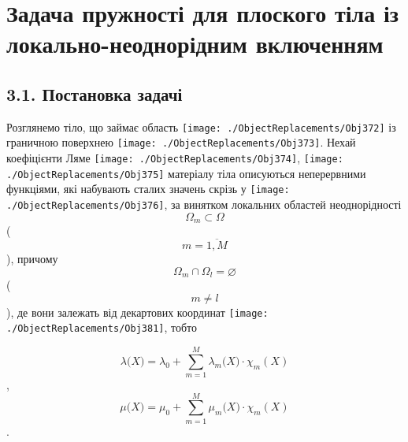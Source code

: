 \hypertarget{ux437ux430ux434ux430ux447ux430-ux43fux440ux443ux436ux43dux43eux441ux442ux456-ux434ux43bux44f-ux43fux43bux43eux441ux43aux43eux433ux43e-ux442ux456ux43bux430-ux456ux437-ux43bux43eux43aux430ux43bux44cux43dux43e-ux43dux435ux43eux434ux43dux43eux440ux456ux434ux43dux438ux43c-ux432ux43aux43bux44eux447ux435ux43dux43dux44fux43c}{%
\section[Задача пружності для плоского тіла із локально-неоднорідним
включенням]{\texorpdfstring{\protect\hypertarget{anchor-44}{}{}Задача
пружності для плоского тіла із локально-неоднорідним
включенням}{Задача пружності для плоского тіла із локально-неоднорідним включенням}}\label{ux437ux430ux434ux430ux447ux430-ux43fux440ux443ux436ux43dux43eux441ux442ux456-ux434ux43bux44f-ux43fux43bux43eux441ux43aux43eux433ux43e-ux442ux456ux43bux430-ux456ux437-ux43bux43eux43aux430ux43bux44cux43dux43e-ux43dux435ux43eux434ux43dux43eux440ux456ux434ux43dux438ux43c-ux432ux43aux43bux44eux447ux435ux43dux43dux44fux43c}}

\hypertarget{ux43fux43eux441ux442ux430ux43dux43eux432ux43aux430-ux437ux430ux434ux430ux447ux456-1}{%
\subsection[3.1. Постановка
задачі]{\texorpdfstring{\protect\hypertarget{anchor-45}{}{}3.1.
Постановка
задачі}{3.1. Постановка задачі}}\label{ux43fux43eux441ux442ux430ux43dux43eux432ux43aux430-ux437ux430ux434ux430ux447ux456-1}}

Розглянемо тіло, що займає область
\texttt{[image: ./ObjectReplacements/Obj372]}
із граничною поверхнею
\texttt{[image: ./ObjectReplacements/Obj373]}.
Нехай коефіцієнти Ляме
\texttt{[image: ./ObjectReplacements/Obj374]},
\texttt{[image: ./ObjectReplacements/Obj375]}
матеріалу тіла описуються неперервними функціями, які набувають сталих
значень скрізь у
\texttt{[image: ./ObjectReplacements/Obj376]},
за винятком локальних областей неоднорідності
\[{\Omega_{m}\subset\Omega}{}\] (\[{m = \overline{1,M}}{}\]), причому
\[{{\Omega_{m} \cap \Omega_{l}} = \varnothing}{}\](\[{m \neq l}{}\]), де
вони залежать від декартових координат
\texttt{[image: ./ObjectReplacements/Obj381]},
тобто

\[{\lambda(X{) = {\lambda_{0} + {\sum\limits_{m = 1}^{M}{\lambda_{m}(X{) \cdot \chi_{m}}(X)}}}}}{}\],
\[{\mu(X{) = {\mu_{0} + {\sum\limits_{m = 1}^{M}{\mu_{m}(X{) \cdot \chi_{m}}(X)}}}}}{}\].

